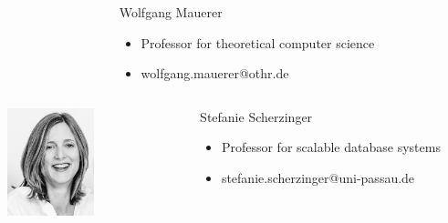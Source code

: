 \documentclass{beamer}
\begin{document}
\begin{frame}
\begin{minipage}[c]{1.0\linewidth}
\begin{columns}
\begin{column}{0.35\textwidth}
\begin{center}
			\end{center}
		\end{column}
		\begin{column}{0.7\textwidth}
		\begin{block}{Wolfgang Mauerer}
			\begin{itemize}
				\item Professor for theoretical computer science
				\item wolfgang.mauerer@othr.de
			\end{itemize}
		\end{block}
		\end{column}
		\end{columns}

	\end{minipage}
	\begin{minipage}[c]{1.0\linewidth}
		\begin{columns}
		\begin{column}{0.35\textwidth}
			\begin{center}
     		\includegraphics[width=0.5\textwidth]{pics/speakers_scherzinger.jpeg}
			\end{center}
		\end{column}
		\begin{column}{0.7\textwidth}
		\begin{block}{Stefanie Scherzinger}
			\begin{itemize}
				\item Professor for scalable database systems
				\item stefanie.scherzinger@uni-passau.de
			\end{itemize}
		\end{block}
		\end{column}
		\end{columns}
	\end{minipage}
	\end{frame}
\end{document}
